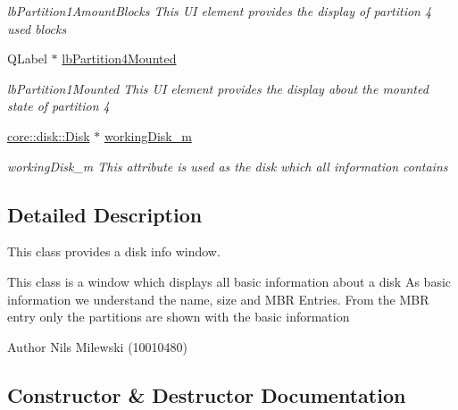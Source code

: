 \begin{DoxyCompactItemize}
\begin{DoxyCompactList}\small\item\em lb\+Partition1\+Amount\+Blocks This UI element provides the display of partition 4 used blocks \end{DoxyCompactList}\item 
\mbox{\label{classui_1_1window_1_1_disk_info_a4bf4decf4fd58a568d31cffd3fbcd9f3}} 
Q\+Label $\ast$ \mbox{\hyperlink{classui_1_1window_1_1_disk_info_a4bf4decf4fd58a568d31cffd3fbcd9f3}{lb\+Partition4\+Mounted}}
\begin{DoxyCompactList}\small\item\em lb\+Partition1\+Mounted This UI element provides the display about the mounted state of partition 4 \end{DoxyCompactList}\item 
\mbox{\label{classui_1_1window_1_1_disk_info_a61fcd8caba70cb0c493618e7263a0015}} 
\mbox{\hyperlink{classcore_1_1disk_1_1_disk}{core\+::disk\+::\+Disk}} $\ast$ \mbox{\hyperlink{classui_1_1window_1_1_disk_info_a61fcd8caba70cb0c493618e7263a0015}{working\+Disk\+\_\+m}}
\begin{DoxyCompactList}\small\item\em working\+Disk\+\_\+m This attribute is used as the disk which all information contains \end{DoxyCompactList}\end{DoxyCompactItemize}


\subsection{Detailed Description}
This class provides a disk info window. 

This class is a window which displays all basic information about a disk As basic information we understand the name, size and M\+BR Entries. From the M\+BR entry only the partitions are shown with the basic information \begin{DoxyAuthor}{Author}
Nils Milewski (10010480) 
\end{DoxyAuthor}


\subsection{Constructor \& Destructor Documentation}
\mbox{\label{classui_1_1window_1_1_disk_info_aca4cde2e854e44f42f3edb8c9bba47ea}} 
